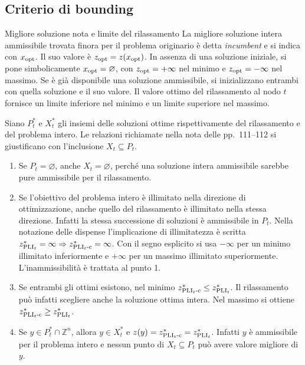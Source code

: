 \subsection{Criterio di bounding}

\begin{definition}{Migliore soluzione nota e limite del rilassamento}
La migliore soluzione intera ammissibile trovata finora per il problema
originario è detta \emph{incumbent} e si indica con $x_{\mathrm{opt}}$.
Il suo valore è $z_{\mathrm{opt}}=z(x_{\mathrm{opt}})$. In assenza di una soluzione iniziale,
si pone simbolicamente $x_{\mathrm{opt}}=\varnothing$, con $z_{\mathrm{opt}}=+\infty$ nel
minimo e $z_{\mathrm{opt}}=-\infty$ nel massimo. Se è già disponibile una soluzione
ammissibile, si inizializzano entrambi con quella soluzione e il suo valore.
Il valore ottimo del rilassamento al nodo $t$ fornisce un limite inferiore
nel minimo e un limite superiore nel massimo.
\end{definition}

Siano $P_t^*$ e $X_t^*$ gli insiemi delle soluzioni ottime rispettivamente
del rilassamento e del problema intero. Le relazioni richiamate nella nota
delle pp.~111--112 si giustificano con l'inclusione $X_t\subseteq P_t$.
\begin{enumerate}
 \item Se $P_t=\varnothing$, anche $X_t=\varnothing$, perché una soluzione
       intera ammissibile sarebbe pure ammissibile per il rilassamento.
 \item Se l'obiettivo del problema intero è illimitato nella direzione
       di ottimizzazione, anche quello del rilassamento è illimitato
       nella stessa direzione. Infatti la stessa successione di soluzioni
       è ammissibile in $P_t$. Nella notazione delle dispense l'implicazione
       di illimitatezza è scritta $z^*_{\mathrm{PLI}_{t}}=\infty\Rightarrow
       z^*_{\mathrm{PLI}_{t}\text{-c}}=\infty$. Con il segno esplicito si usa $-\infty$
       per un minimo illimitato inferiormente e $+\infty$ per un massimo
       illimitato superiormente. L'inammissibilità è trattata al punto 1.
 \item Se entrambi gli ottimi esistono, nel minimo
       $z^*_{\mathrm{PLI}_{t}\text{-c}}\leq z^*_{\mathrm{PLI}_{t}}$. Il rilassamento può infatti
       scegliere anche la soluzione ottima intera. Nel massimo si ottiene
       $z^*_{\mathrm{PLI}_{t}\text{-c}}\geq z^*_{\mathrm{PLI}_{t}}$.
 \item Se $y\in P_t^*\cap\mathbb Z^n$, allora $y\in X_t^*$ e
       $z(y)=z^*_{\mathrm{PLI}_{t}\text{-c}}=z^*_{\mathrm{PLI}_{t}}$. Infatti $y$ è ammissibile
       per il problema intero e nessun punto di $X_t\subseteq P_t$ può
       avere valore migliore di $y$.
\end{enumerate}

